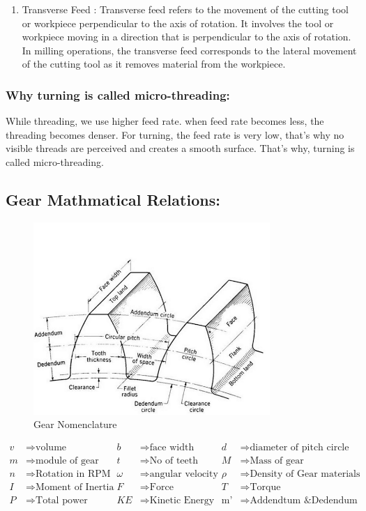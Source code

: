 \documentclass{article}
\begin{document}
\begin{enumerate}
\begin{enumerate}
      \item Transverse Feed : Transverse feed refers to the movement of the cutting tool or workpiece perpendicular to the axis of rotation. It involves the tool or workpiece moving in a direction that is perpendicular to the axis of rotation. In milling operations, the transverse feed corresponds to the lateral movement of the cutting tool as it removes material from the workpiece.
    \end{enumerate}
\end{enumerate}

\subsubsection*{Why turning is called micro-threading:}
While threading, we use higher feed rate. when feed rate becomes less, the threading becomes denser. For turning, the feed rate is very low, that's why no visible threads are perceived and creates a smooth surface. That's why, turning is called micro-threading. 

\subsection*{Gear Mathmatical Relations:}
\begin{figure}
  \centering
  \includegraphics*[width=0.8\textwidth]{img/gear_nomen.png}
  \caption{Gear Nomenclature}
\end{figure}

\begin{align*}
  v &\Rightarrow \text{volume} &
  b &\Rightarrow \text{face width} &
  d &\Rightarrow \text{diameter of pitch circle} \\
  m &\Rightarrow \text{module of gear} & 
  t &\Rightarrow \text{No of teeth} &
  M &\Rightarrow \text{Mass of gear} \\ 
  n &\Rightarrow \text{Rotation in RPM} & 
  \omega &\Rightarrow \text{angular velocity} &
  \rho &\Rightarrow \text{Density of Gear materials} \\ 
  I &\Rightarrow \text{Moment of Inertia} & 
  F &\Rightarrow \text{Force} &
  T &\Rightarrow \text{Torque} \\
  P &\Rightarrow \text{Total power} &
  KE &\Rightarrow \text{Kinetic Energy} & 
  \text{m'} &\Rightarrow \text{Addendtum \& Dedendum} 
\end{align*}
\end{document}
